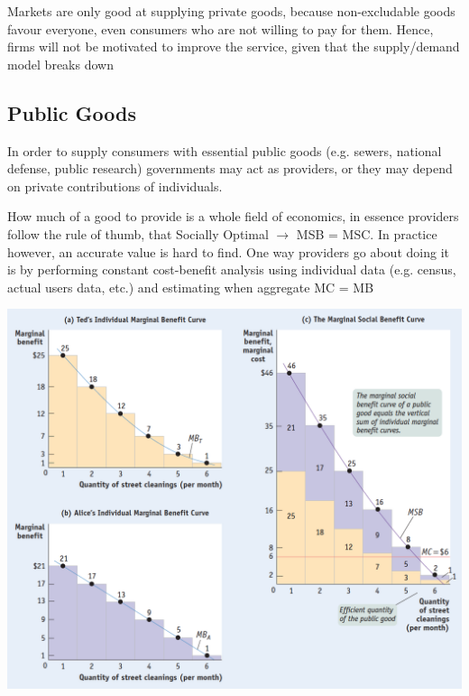 \documentclass[english,course]{Notes}
\begin{document}
\par{Markets are only good at supplying private goods, because non-excludable goods favour everyone, even consumers who are not willing to pay for them. Hence, firms will not be motivated to improve the service, given that the supply/demand model  breaks down}

 

\subsection{Public Goods}


\par{In order to supply consumers with essential public goods (e.g. sewers, national defense, public research) governments may act as providers, or they may depend on private contributions of individuals.}
\par{How much of a good to provide is a whole field of economics, in essence providers follow the rule of thumb, that Socially Optimal $\rightarrow$ MSB = MSC. In practice however, an accurate value is hard to find. One way providers go about doing it is by performing constant cost-benefit analysis using individual data (e.g. census, actual users data, etc.) and estimating when aggregate MC = MB }

\includegraphics[width=\textwidth]{public}
\end{document}
